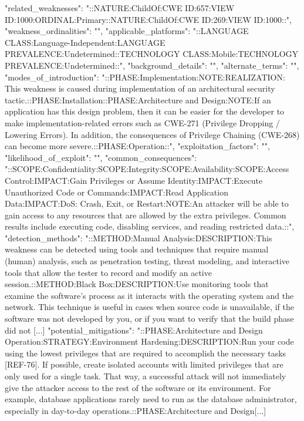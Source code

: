 \begin{code}
{{{{{        "related_weaknesses": "::NATURE:ChildOf:CWE ID:657:VIEW ID:1000:ORDINAL:Primary::NATURE:ChildOf:CWE ID:269:VIEW ID:1000::",
        "weakness_ordinalities": "",
        "applicable_platforms": "::LANGUAGE CLASS:Language-Independent:LANGUAGE PREVALENCE:Undetermined::TECHNOLOGY CLASS:Mobile:TECHNOLOGY PREVALENCE:Undetermined::",
        "background_details": "",
        "alternate_terms": "",
        "modes_of_introduction": "::PHASE:Implementation:NOTE:REALIZATION: This weakness is caused during implementation of an architectural security tactic.::PHASE:Installation::PHASE:Architecture and Design:NOTE:If an application has this design problem, then it can be easier for the developer to make implementation-related errors such as CWE-271 (Privilege Dropping / Lowering Errors). In addition, the consequences of Privilege Chaining (CWE-268) can become more severe.::PHASE:Operation::",
        "exploitation_factors": "",
        "likelihood_of_exploit": "",
        "common_consequences": "::SCOPE:Confidentiality:SCOPE:Integrity:SCOPE:Availability:SCOPE:Access Control:IMPACT:Gain Privileges or Assume Identity:IMPACT:Execute Unauthorized Code or Commands:IMPACT:Read Application Data:IMPACT:DoS: Crash, Exit, or Restart:NOTE:An attacker will be able to gain access to any resources that are allowed by the extra privileges. Common results include executing code, disabling services, and reading restricted data.::",
        "detection_methods": "::METHOD:Manual Analysis:DESCRIPTION:This weakness can be detected using tools and techniques that require manual (human) analysis, such as penetration testing, threat modeling, and interactive tools that allow the tester to record and modify an active session.::METHOD:Black Box:DESCRIPTION:Use monitoring tools that examine the software's process as it interacts with the operating system and the network. This technique is useful in cases when source code is unavailable, if the software was not developed by you, or if you want to verify that the build phase did not [...]
        "potential_mitigations": "::PHASE:Architecture and Design Operation:STRATEGY:Environment Hardening:DESCRIPTION:Run your code using the lowest privileges that are required to accomplish the necessary tasks [REF-76]. If possible, create isolated accounts with limited privileges that are only used for a single task. That way, a successful attack will not immediately give the attacker access to the rest of the software or its environment. For example, database applications rarely need to run as the database administrator, especially in day-to-day operations.::PHASE:Architecture and Design[...]
}}}}}
\end{code}
